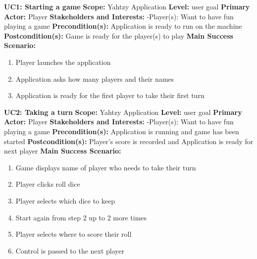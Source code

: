 \documentclass[12pt]{article}
\begin{document}
\newpage
\begin{list}{}{}

\item {\bf UC1: Starting a game } \newline
{\bf Scope:} Yahtzy Application \newline
{\bf Level:} user goal \newline
{\bf Primary Actor:} Player \newline
{\bf Stakeholders and Interests:} \newline
\indent -Player(s): Want to have fun playing a game \newline
{\bf Precondition(s):} Application is ready to run on the machine \newline
{\bf Postcondition(s):} Game is ready for the player(s) to play \newline \newline
{\bf Main Success Scenario:}
\begin{enumerate}
	\item Player launches the application
	\item Application asks how many players and their names
	\item Application is ready for the first player to take their first turn
\end{enumerate}

\vspace*{.5in}

\item {\bf UC2: Taking a turn} \newline
{\bf Scope:} Yahtzy Application \newline
{\bf Level:} user goal \newline
{\bf Primary Actor:} Player \newline
{\bf Stakeholders and Interests:} \newline
\indent -Player(s): Want to have fun playing a game \newline
\textbf{Precondition(s):} Application is running and game has been started \newline
\textbf{Postcondition(s):} Player’s score is recorded and Application is ready for next player \newline \newline
\textbf{Main Success Scenario:}
\begin{enumerate}
\item Game displays name of player who needs to take their turn
\item Player clicks roll dice
\item Player selects which dice to keep
\item Start again from step 2 up to 2 more times
\item Player selects where to score their roll
\item Control is passed to the next player
\end{enumerate}


\end{list}
\end{document}
